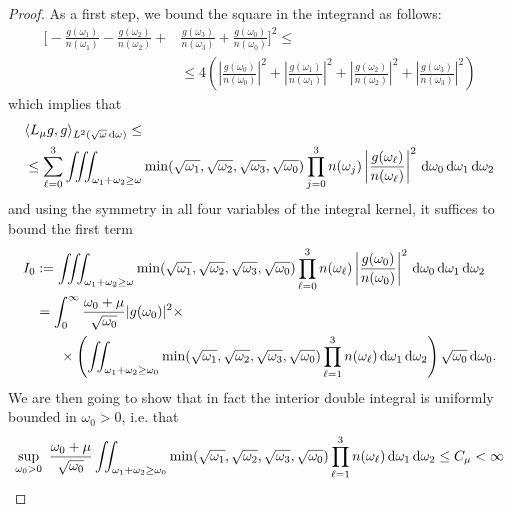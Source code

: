 \documentclass[reqno,11pt,letterpaper]{amsart}
\numberwithin{equation}{section}
\newcommand{\dd}{\, {\rm d}}
\begin{document}
\begin{proof}
    As a first step, we bound the square in the integrand as follows: 
  \begin{align*}
  \Bigg[- \frac{g(\omega_1)}{n(\omega_1)} - \frac{g(\omega_2)}{n(\omega_2)} + &\frac{g(\omega_3)}{n(\omega_3)} + \frac{g(\omega_0)}{n(\omega_0)} \Bigg]^2  \leq \\
 &\leq   4 \left( 
    \left\vert \frac{g(\omega_0)}{n(\omega_0)}\right\vert^2 + \left\vert \frac{g(\omega_1)}{n(\omega_1)}\right\vert^2 + \left\vert \frac{g(\omega_2)}{n(\omega_2)}\right\vert^2+ \left\vert \frac{g(\omega_3)}{n(\omega_3)}\right\vert^2 \right)  
    \end{align*}
     which implies that 
  \begin{align*}
  &  \langle L_\mu g, g \rangle_{L^2(\sqrt{\omega} \dd \omega)} \leq \\
    &\leq \sum_{\ell=0}^3 
    \iiint_{\omega_1+\omega_2\geq \omega} \min (\sqrt{\omega_1}, \sqrt{\omega_2}, \sqrt{\omega_3}, \sqrt{\omega_0}) \prod_{j=0}^3 n(\omega_j) \left\vert \frac{g(\omega_\ell)}{n(\omega_\ell)}\right\vert^2 \dd \omega_0 \dd \omega_1 \dd \omega_2 
    \end{align*}
    and using the symmetry in all four variables of the integral kernel, it suffices to bound the first term 
    \begin{equation}
\begin{split}
I_0 &:=  \iiint_{\omega_1+\omega_2\geq \omega} \min (\sqrt{\omega_1}, \sqrt{\omega_2}, \sqrt{\omega_3}, \sqrt{\omega_0}) \prod_{\ell=0}^3 n(\omega_\ell) \left\vert \frac{g(\omega_0)}{n(\omega_0)}\right\vert^2 \dd \omega_0 \dd \omega_1 \dd \omega_2 \\
&  = 
\int_0^\infty \frac{\omega_0 +\mu}{\sqrt{\omega_0}} |g(\omega_0)|^2\times \\
&\hskip 0.6cm \times  \left(\iint_{\omega_1+\omega_2 \geq \omega_0} \min (\sqrt{\omega_1}, \sqrt{\omega_2}, \sqrt{\omega_3}, \sqrt{\omega_0}) \prod_{\ell=1}^3 n(\omega_\ell) \dd \omega_1 \dd \omega_2\right) \sqrt{\omega_0}\dd \omega_0. 
    \end{split}
    \end{equation}
    We are then going to show that in fact the interior double integral is uniformly bounded in $\omega_0>0$, i.e. that 
    \begin{align} \label{eq: unif bound}
    \sup_{\omega_0>0}\ \frac{\omega_0 +\mu}{\sqrt{\omega_0}} 
 \iint_{\omega_1+\omega_2 \geq \omega_0} \min (\sqrt{\omega_1}, \sqrt{\omega_2}, \sqrt{\omega_3}, \sqrt{\omega_0}) \prod_{\ell=1}^3 n(\omega_\ell) \dd \omega_1 \dd \omega_2 \leq C_\mu <\infty

\end{align}
\end{proof}
\end{document}
